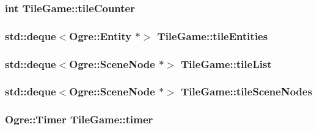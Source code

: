 \hypertarget{classTileGame_a0a94db2f1d3da7a330e415d48c18e763}{
\subsubsection[{tile\-Counter}]{\setlength{\rightskip}{0pt plus 5cm}int Tile\-Game\-::tile\-Counter\hspace{0.3cm}{\ttfamily [protected]}}}\label{classTileGame_a0a94db2f1d3da7a330e415d48c18e763}
\hypertarget{classTileGame_aad2a30c885c91193d0a6da18f1477de5}{
\subsubsection[{tile\-Entities}]{\setlength{\rightskip}{0pt plus 5cm}std\-::deque$<$Ogre\-::\-Entity $\ast$$>$ Tile\-Game\-::tile\-Entities\hspace{0.3cm}{\ttfamily [protected]}}}\label{classTileGame_aad2a30c885c91193d0a6da18f1477de5}
\hypertarget{classTileGame_ad9bec31020eaa7dc719d8e9b8af20ee2}{
\subsubsection[{tile\-List}]{\setlength{\rightskip}{0pt plus 5cm}std\-::deque$<$Ogre\-::\-Scene\-Node $\ast$$>$ Tile\-Game\-::tile\-List\hspace{0.3cm}{\ttfamily [protected]}}}\label{classTileGame_ad9bec31020eaa7dc719d8e9b8af20ee2}
\hypertarget{classTileGame_ac8b228c7849cb924a099f94de266c42d}{
\subsubsection[{tile\-Scene\-Nodes}]{\setlength{\rightskip}{0pt plus 5cm}std\-::deque$<$Ogre\-::\-Scene\-Node $\ast$$>$ Tile\-Game\-::tile\-Scene\-Nodes\hspace{0.3cm}{\ttfamily [protected]}}}\label{classTileGame_ac8b228c7849cb924a099f94de266c42d}
\hypertarget{classTileGame_adbfc142c4bd14007f4aec65b164bbea7}{
\subsubsection[{timer}]{\setlength{\rightskip}{0pt plus 5cm}Ogre\-::\-Timer Tile\-Game\-::timer\hspace{0.3cm}{\ttfamily [protected]}}}\label{classTileGame_adbfc142c4bd14007f4aec65b164bbea7}
